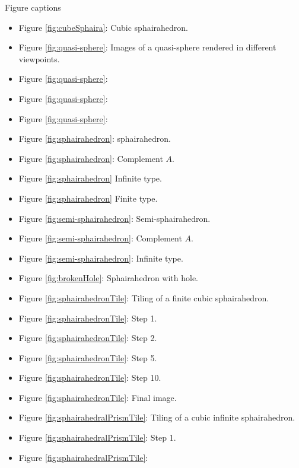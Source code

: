 \documentclass[suppldata, dvipdfmx]{interact}
\theoremstyle{plain}%
\theoremstyle{definition}
\theoremstyle{remark}
\theoremstyle{problemstyle}
\begin{document}
Figure captions
\begin{itemize}
 \item Figure \ref{fig:cubeSphaira}: Cubic sphairahedron.
 \item Figure \ref{fig:quasi-sphere}: Images of a quasi-sphere rendered
       in different viewpoints. 
 \item Figure \ref{fig:quasi-sphere}:
 \item Figure \ref{fig:quasi-sphere}:
 \item Figure \ref{fig:quasi-sphere}:
 \item Figure \ref{fig:sphairahedron}: sphairahedron.
 \item Figure \ref{fig:sphairahedron}:
       Complement $A$.
 \item Figure \ref{fig:sphairahedron}
       Infinite type.
 \item Figure \ref{fig:sphairahedron}
       Finite type.
 \item Figure \ref{fig:semi-sphairahedron}: Semi-sphairahedron.
 \item Figure \ref{fig:semi-sphairahedron}:
       Complement $A$.
 \item Figure \ref{fig:semi-sphairahedron}:
       Infinite type.
 \item Figure \ref{fig:brokenHole}: Sphairahedron with hole.
 \item Figure \ref{fig:sphairahedronTile}: Tiling of a finite cubic
       sphairahedron.
 \item Figure \ref{fig:sphairahedronTile}: Step 1.
 \item Figure \ref{fig:sphairahedronTile}: Step 2.
 \item Figure \ref{fig:sphairahedronTile}: Step 5.
 \item Figure \ref{fig:sphairahedronTile}: Step
       10.
 \item Figure \ref{fig:sphairahedronTile}:
       Final image.
 \item Figure \ref{fig:sphairahedralPrismTile}: Tiling of a cubic infinite sphairahedron.
 \item Figure \ref{fig:sphairahedralPrismTile}:
       Step 1.
 \item Figure \ref{fig:sphairahedralPrismTile}:

\end{itemize}
\end{document}
